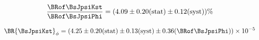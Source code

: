 \begin{equation}
\label{eq:norm_jpsiPhi_result}
\frac{\BRof\BsJpsiKst}{\BRof\BsJpsiPhi} = (4.09 \pm 0.20 ({\rm stat}) \pm 0.12 ({\rm syst}))\% \\
\end{equation}


\begin{equation}
\label{Br_JpsiPhi}
\BR{\BsJpsiKst}_{\phi} = (4.25 \pm 0.20  \text{(stat)} \pm  0.13  \text{(syst)}  \pm 0.36 (\BRof\BsJpsiPhi))\times 10^{-5}
\end{equation}


